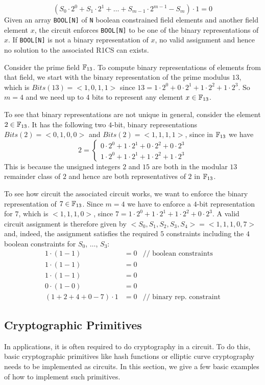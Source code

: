 $$
(S_0\cdot 2^0 + S_1\cdot 2^1 + \ldots + S_{m-1}\cdot 2^{m-1} -S_m)\cdot 1 = 0
$$
Given an array \texttt{BOOL[N]} of \texttt{N} boolean constrained field elements and another field element $x$, the circuit enforces \texttt{BOOL[N]} to be one of the binary representations of $x$. If \texttt{BOOL[N]} is not a binary representation of $x$, no valid assignment and hence no solution to the associated R1CS can exists. 
\begin{example} Consider the prime field $\mathbb{F}_{13}$. To compute binary representations of elements from that field, we start with the binary representation of the prime modulus $13$, which is $Bits(13) = <1,0,1,1>$ since $13= 1\cdot 2^0 + 0\cdot 2^1 + 1\cdot 2^2 + 1\cdot 2^3$. So $m=4$ and we need up to $4$ bits to represent any element $x\in\mathbb{F}_{13}$.

To see that binary representations are not unique in general, consider the element $2\in \mathbb{F}_{13}$. It has the following two $4$-bit, binary representations $Bits(2)=<0,1,0,0>$ and $Bits(2)=<1,1,1,1>$, since in $\mathbb{F}_{13}$ we have
$$
2 = \begin{cases}
0\cdot 2^0 + 1\cdot 2^1 + 0\cdot 2^2 + 0\cdot 2^3\\
1\cdot 2^0 + 1\cdot 2^1 + 1\cdot 2^2 + 1\cdot 2^3
\end{cases}
$$
This is because the unsigned integers $2$ and $15$ are both in the modular $13$ remainder class of $2$ and hence are both representatives of $2$ in $\mathbb{F}_{13}$.

To see how circuit the associated circuit works, we want to enforce the binary representation of $7\in \mathbb{F}_{13}$. Since $m=4$ we have to enforce a $4$-bit representation for $7$, which is $<1,1,1,0>$, since $7= 1\cdot 2^0 + 1\cdot 2^1 + 1\cdot 2^2 + 0\cdot 2^3$. A valid circuit assignment is therefore given by $<S_0,S_1,S_2,S_3,S_4>=<1,1,1,0,7>$ and, indeed, the assignment satisfies the required $5$ constraints including the $4$ boolean constraints for $S_0$, $\ldots$, $S_3$: 
\begin{align*}
1\cdot (1-1) &= 0 & \text{// boolean constraints}\\
1\cdot (1-1) &= 0 \\
1\cdot (1-1) &= 0 \\
0\cdot (1-0) &= 0  \\
(1 + 2 + 4 + 0 -7)\cdot 1 &= 0  & \text{// binary rep. constraint}
\end{align*}
\end{example}
\subsection{Cryptographic Primitives}
In applications, it is often required to do cryptography in a circuit. To do this, basic cryptographic primitives like hash functions or elliptic curve cryptography needs to be implemented as circuits. In this section, we give a few basic examples of how to implement such primitives. 
